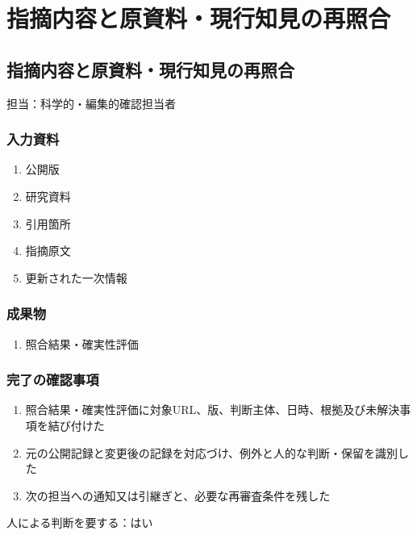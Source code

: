 \documentclass[a4paper,11pt]{article}
\begin{document}
\section{指摘内容と原資料・現行知見の再照合}
\subsection{指摘内容と原資料・現行知見の再照合}
\par 担当：科学的・編集的確認担当者\par\medskip
\subsubsection*{入力資料}
\begin{enumerate}[leftmargin=2em,itemsep=0.35em]
\item 公開版
\item 研究資料
\item 引用箇所
\item 指摘原文
\item 更新された一次情報
\end{enumerate}
\subsubsection*{成果物}
\begin{enumerate}[leftmargin=2em,itemsep=0.35em]
\item 照合結果・確実性評価
\end{enumerate}
\subsubsection*{完了の確認事項}
\begin{enumerate}[leftmargin=2em,itemsep=0.35em]
\item 照合結果・確実性評価に対象URL、版、判断主体、日時、根拠及び未解決事項を結び付けた
\item 元の公開記録と変更後の記録を対応づけ、例外と人的な判断・保留を識別した
\item 次の担当への通知又は引継ぎと、必要な再審査条件を残した
\end{enumerate}
\par 人による判断を要する：はい\par\medskip
\end{document}

